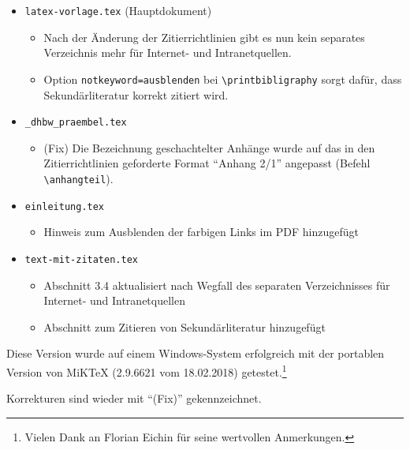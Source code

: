 \begin{itemize}
\item \verb|latex-vorlage.tex| (Hauptdokument)
\begin{itemize}
\item Nach der Änderung der Zitierrichtlinien gibt es nun kein separates Verzeichnis mehr für Internet- und Intranetquellen.
\item Option \verb|notkeyword=ausblenden| bei \verb|\printbibligraphy| sorgt dafür, dass Sekundärliteratur korrekt zitiert wird.
\end{itemize}

\item \verb|_dhbw_praembel.tex|
\begin{itemize}
\item (Fix) Die Bezeichnung geschachtelter Anhänge wurde auf das in den Zitierrichtlinien geforderte Format \enquote{Anhang 2/1} angepasst (Befehl \verb|\anhangteil|).
\end{itemize}

\item \verb|einleitung.tex|
\begin{itemize}
\item Hinweis zum Ausblenden der farbigen Links im PDF hinzugefügt
\end{itemize}

\item \verb|text-mit-zitaten.tex|
\begin{itemize}
\item Abschnitt 3.4 aktualisiert nach Wegfall des separaten Verzeichnisses für Internet- und Intranetquellen
\item Abschnitt zum Zitieren von Sekundärliteratur hinzugefügt
\end{itemize}

\end{itemize}


\label{anhang:ReleaseNotes16}
Diese Version wurde auf einem Windows-System erfolgreich mit der portablen Version von MiKTeX (2.9.6621 vom 18.02.2018) getestet.\footnote{Vielen Dank an Florian Eichin für seine wertvollen Anmerkungen.}

Korrekturen sind wieder mit \enquote{(Fix)} gekennzeichnet.

\newpage

